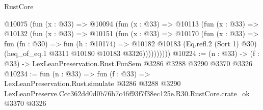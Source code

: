 \begin{lexlean}{RustCore}
\begin{coremodule}
        @10075
          (fun (x : @33) =>
          @10094
            (fun (x : @33) =>
            @10113
              (fun (x : @33) =>
              @10132
                (fun (x : @33) =>
                @10151
                  (fun (x : @33) =>
                  @10170
                    (fun (x : @33) =>
                    fun (fn : @30) =>
                    fun (h : @10174) =>
                    @10182
                      @10183
                      (Eq.refl.{2} (Sort 1) @30)
                      (heq_of_eq.{1} @3311 @10180 @10183 @3326))))))))))
@10224 := (n : @33) -> (f : @33) -> LexLeanPreservation.Rust.FunSem @3286 @3288 @3290 @3370 @3326
@10234 := fun (n : @33) =>
  fun (f : @33) =>
  LexLeanPreservation.Rust.simulate
    @3286
    @3288
    @3290
    LexLeanPreserve.Ccc362dd0d0b76b7c46f93f7f38ec125e.R30.RustCore.crate_ok
    @3370
    @3326
\end{coremodule}
\end{lexlean}
